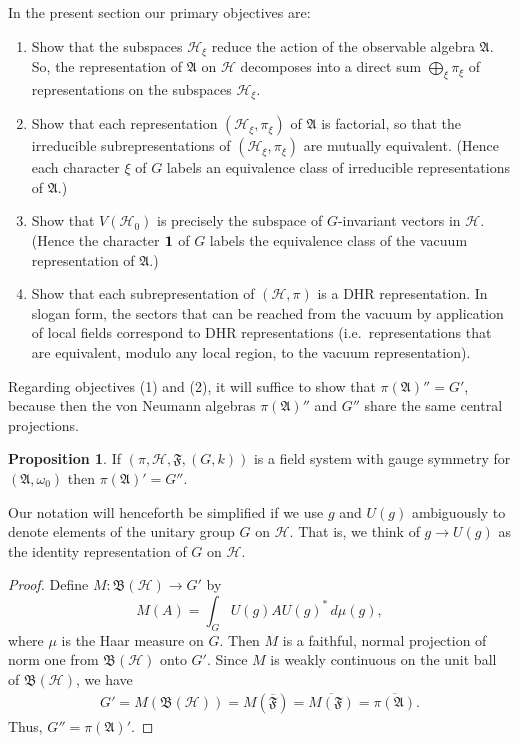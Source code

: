 \documentclass[11pt]{article}
\newcommand{\alg}[1]{\mathfrak{#1}}
\newcommand{\bh}{\mathfrak{B}(\mathcal{H})}
\theoremstyle{definition}
\newtheorem{prop}[thm]{Proposition}
\theoremstyle{definition}
\theoremstyle{remark}
\def\2#1{{\mathcal #1}}
\def\1#1{{\bf #1}}
\def\al#1{{\mathfrak #1}}
\def\om{\omega} \def\Om{\Omega} \def\dd{\partial} \def\D{\Delta}
\newcommand{\fields}{(\pi ,\2H ,\alg{F},(G,k))}
\begin{document}
In the present section our primary objectives are:
\begin{enumerate}
\item Show that the subspaces $\2H _{\xi}$ reduce the action of the
  observable algebra $\al A$.  So, the representation of $\al A$ on
  $\2H$ decomposes into a direct sum $\bigoplus _{\xi}\pi _{\xi}$ of
  representations on the subspaces $\2H _\xi$.
\item Show that each representation $(\2H _\xi ,\pi
  _{\xi})$ of $\al A$ is factorial, so that the
  irreducible subrepresentations of $(\2H _\xi ,\pi
  _\xi )$ are mutually equivalent.  (Hence each
  character $\xi$ of $G$ labels an equivalence class of
  irreducible representations of $\al A$.)
\item Show that $V(\2H _0)$ is precisely the subspace of $G$-invariant
  vectors in $\2H$.  (Hence the character $\11$ of $G$ labels the
  equivalence class of the vacuum representation of $\al A$.)
\item Show that each subrepresentation of $(\2H ,\pi )$
  is a DHR representation.  In slogan form, the sectors
  that can be reached from the vacuum by application of
  local fields correspond to DHR representations (i.e.\
  representations that are equivalent, modulo any local
  region, to the vacuum representation).
\end{enumerate}

Regarding objectives (1) and (2), it will suffice to show that $\pi
(\al A)''=G'$, because then the von Neumann algebras $\pi (\al A)''$
and $G''$ share the same central projections.

\begin{prop} If $\fields$ is a field system with gauge
  symmetry for $(\alg{A},\om _0)$ then $\pi (\al
  A)'=G''$.
\end{prop}

Our notation will henceforth be simplified if we use $g$ and $U(g)$
ambiguously to denote elements of the unitary group $G$ on $\2H$.
That is, we think of $g\to U(g)$ as the identity representation of $G$
on $\2H$.

\begin{proof} Define $M:\bh \to G'$ by
  \[ M(A)=\int _{G}U(g)AU(g)^{*}\, d\mu (g) ,\] where
  $\mu$ is the Haar measure on $G$.  Then $M$ is a
  faithful, normal projection of norm one from $\bh$
  onto $G'$.  Since $M$ is weakly continuous on the
  unit ball of $\bh$, we have
  \begin{eqnarray} G'=M(\bh )=M(\overline{\alg{F}})=\overline{M(\al
      F)} = \overline{\pi (\al A)}. \end{eqnarray} Thus, $G''=\pi
  (\alg{A})'$.
\end{proof}
\end{document}
